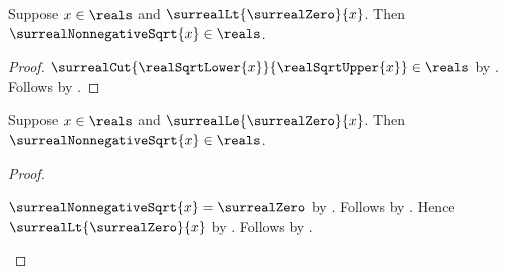 \begin{theorem}\label{surreal_positive_real_sqrt_closed}
    Suppose $x\in\reals$ and
        $\surrealLt{\surrealZero}{x}$.
    Then $\surrealNonnegativeSqrt{x}\in\reals$.
\end{theorem}
\begin{proof}
    $\surrealCut{\realSqrtLower{x}}{\realSqrtUpper{x}}\in\reals$
        by .
    Follows by .
\end{proof}

\begin{theorem}\label{surreal_real_nonnegative_sqrt_closed}
    Suppose $x\in\reals$ and
        $\surrealLe{\surrealZero}{x}$.
    Then $\surrealNonnegativeSqrt{x}\in\reals$.
\end{theorem}
\begin{proof}
    \begin{byCase}
            $\surrealNonnegativeSqrt{x}=\surrealZero$
                by .
            Follows by .
            Hence $\surrealLt{\surrealZero}{x}$
                by .
            Follows by .
    \end{byCase}
\end{proof}

